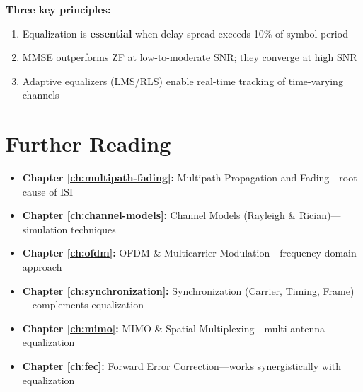 \begin{keyconcept}
\textbf{Three key principles:}
\begin{enumerate}
\item Equalization is \textbf{essential} when delay spread exceeds 10\% of symbol period
\item MMSE outperforms ZF at low-to-moderate SNR; they converge at high SNR
\item Adaptive equalizers (LMS/RLS) enable real-time tracking of time-varying channels
\end{enumerate}
\end{keyconcept}

\section{Further Reading}

\begin{itemize}
\item \textbf{Chapter \ref{ch:multipath-fading}:} Multipath Propagation and Fading---root cause of ISI
\item \textbf{Chapter \ref{ch:channel-models}:} Channel Models (Rayleigh \& Rician)---simulation techniques
\item \textbf{Chapter \ref{ch:ofdm}:} OFDM \& Multicarrier Modulation---frequency-domain approach
\item \textbf{Chapter \ref{ch:synchronization}:} Synchronization (Carrier, Timing, Frame)---complements equalization
\item \textbf{Chapter \ref{ch:mimo}:} MIMO \& Spatial Multiplexing---multi-antenna equalization
\item \textbf{Chapter \ref{ch:fec}:} Forward Error Correction---works synergistically with equalization
\end{itemize}
